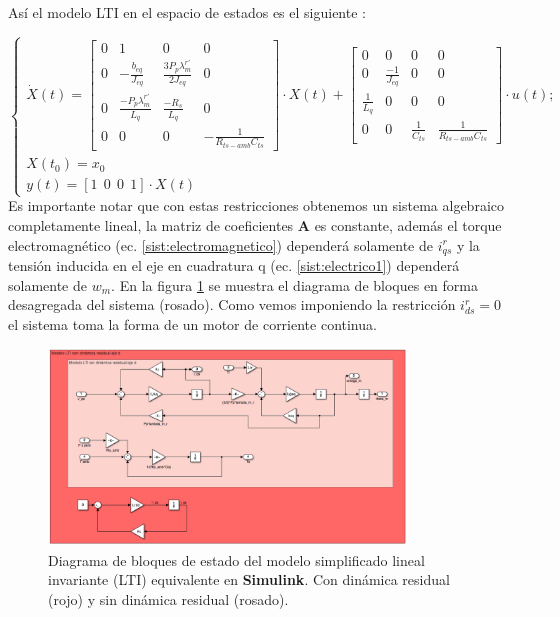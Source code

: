 \documentclass[10pt]{article}
\begin{document}
\begin{enumerate}
\begin{itemize}
	Así el modelo LTI en el espacio de estados es el siguiente  :
	
	\begin{equation}
	\begin{cases}
	\dot{X}(t)=\begin{bmatrix}
	0 & 1 &0 &0\\ 
	0 & -\frac{b_{eq}}{J_{eq}} & \frac{3 P_{p} \lambda^{r'}_{m}}{2 J_{eq}} & 0\\ 
	0  & \frac{- P_{p} \lambda^{r'}_{m}}{ L_{q}} & \frac{-R_{s}}{L_{q}} & 0\\
	0 & 0 & 0 & -\frac{1}{R_{ts-amb} C_{ts}}
	\end{bmatrix}\cdot X(t) + \begin{bmatrix}
	0 &0 &0 &0\\ 
	0 &\frac{-1}{J_{eq}} &0 &0\\ 
	 \frac{1}{L_{q}}&0 &0 & 0\\
	0 & 0 & \frac{1}{C_{ts}} & \frac{1}{R_{ts-amb} C_{ts}}
	\end{bmatrix} 
	\cdot u(t); \\
	X(t_{0})=x_{0}\\ 
	y(t)=[1 \ \ 0 \ \ 0 \ \ 1] \cdot X(t)
	\end{cases}
	\label{eq:2.1.2.c.4}
	\end{equation}
	Es importante notar que con estas restricciones obtenemos un sistema algebraico completamente lineal, la matriz de coeficientes \textbf{A} es constante, además el torque electromagnético (ec. \ref{sist:electromagnetico}) dependerá solamente de $i^{r}_{qs}$ y la tensión inducida en el eje en cuadratura q (ec. \ref{sist:electrico1}) dependerá solamente de $w_{m}$.
	En la figura \ref{fig:diagLTI} se muestra el diagrama de bloques en forma desagregada del sistema (rosado). Como vemos imponiendo la restricción $i^{r}_{ds}=0$ el sistema toma la forma de un motor de corriente continua.
	\begin{figure}[h!]
		\centering
		\includegraphics[width=0.85\textwidth]{DiagramabloquesLTI.png}
		\caption{\label{fig:diagLTI} Diagrama de bloques de estado del modelo simplificado lineal invariante (LTI) equivalente en \textbf{Simulink}. Con dinámica residual (rojo) y sin dinámica residual (rosado). }
	\end{figure}


\end{itemize}
\end{enumerate}
\end{document}
